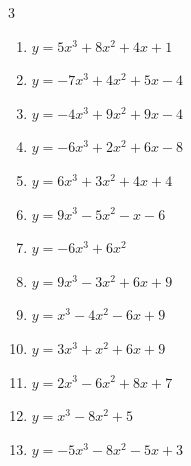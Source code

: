 \begin{multicols}{3}
\begin{enumerate}
  \item $y=5x^{3}+8x^{2}+4x+1$


  \item $y=-7x^{3}+4x^{2}+5x-4$


  \item $y=-4x^{3}+9x^{2}+9x-4$


  \item $y=-6x^{3}+2x^{2}+6x-8$


  \item $y=6x^{3}+3x^{2}+4x+4$


  \item $y=9x^{3}-5x^{2}-x-6$


  \item $y=-6x^{3}+6x^{2}$


\columnbreak %

  \item $y=9x^{3}-3x^{2}+6x+9$


  \item $y=x^{3}-4x^{2}-6x+9$


  \item $y=3x^{3}+x^{2}+6x+9$


  \item $y=2x^{3}-6x^{2}+8x+7$


  \item $y=x^{3}-8x^{2}+5$


  \item $y=-5x^{3}-8x^{2}-5x+3$


\end{enumerate}
\end{multicols}
